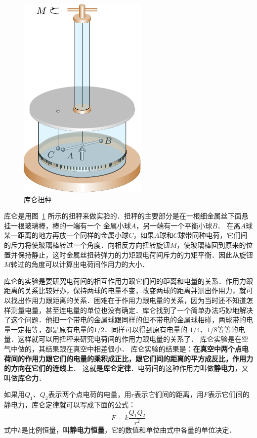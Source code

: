 \begin{figure}[htbp]
    \centering
    \includegraphics{fig/B/6-3.pdf}
    \caption{库仑扭秤}\label{fig_B_6-3}
\end{figure}

库仑是用图~\ref{fig_B_6-3} 所示的扭秤来做实验的．扭秤的主要部分是在一根细金属丝下面悬挂一根玻璃棒，棒的一端有一个
金属小球$A$，另一端有一个平衡小球$B$．
在离$A$球某一距离的地方再放一个同样的金属小球$C$，如果$A$球和$C$球带同种电荷，它们间的斥力将使玻璃棒转过一个角度．向相反方向扭转旋钮$M$，使玻璃棒回到原来的位置并保持静止，这时金属丝扭转弹力的力矩跟电荷间斥力的力矩平衡．因此从旋钮$M$转过的角度可以计算出电荷间作用力的大小．

库仑的实验是要研究电荷间的相互作用力跟它们间的距离和电量的关系．作用力跟距离的关系比较好办，保持两球的电量不变，改变两球的距离并测出作用力，就可以找出作用力跟距离的关系．困难在于作用力跟电量的关系，因为当时还不知道怎样测量电量，甚至连电量的单位也没有确定．库仑找到了一个简单办法巧妙地解决了这个问题．他把一个带电的金属球跟同样的但不带电的金属球相碰，两球带的电量一定相等，都是原有电量的$1/2$．同样可以得到原有电量的
$1/4$、$1/8$等等的电量．这样就可以用扭秤来研究电荷间的作用力跟电量的关系了．
库仑实验是在空气中做的，其结果跟在真空中相差很小．
库仑实验的结果是：\textbf{在真空中两个点电荷间的作用力跟它们的电量的乘积成正比，跟它们间的距离的平方成反比，作用力的方向在它们的连线上}．
这就是\textbf{库仑定律}．电荷间的这种作用力叫做\textbf{静电力}，又叫做\textbf{库仑力}．

如果用$Q_1$、$Q_2$表示两个点电荷的电量，用$r$表示它们间的距离，用$F$表示它们间的静电力，库仑定律就可以写成下面的公式：
\begin{equation}\label{eq_B-6-1}
F=k\frac{Q_1Q_2}{r^2}
\end{equation}
式中$k$是比例恒量，叫\textbf{静电力恒量}，它的数值和单位由式中各量的单位决定．


